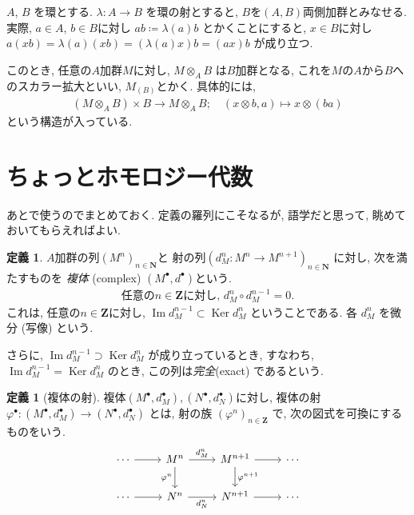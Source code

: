 \documentclass[11pt, a4paper, dvipdfmx]{jsarticle}
\theoremstyle{definition}
\newtheorem{Definition}[Axiom]{定義}
\newcommand{\nn}{\mathbf{N}}
\newcommand{\zz}{\mathbf{Z}}
\newcommand{\Ker}{\mathop{\mathrm{Ker}}\nolimits}
\newcommand{\Img}{\mathop{\mathrm{Im}}\nolimits}
\newcommand{\pphi}{\varphi} %
\numberwithin{equation}{section}
\begin{document}


$A$, $B$ を環とする. $\lambda: A\to B$ を環の射とすると, 
$B$を$(A,B)$両側加群とみなせる. 
実際, $a\in A$, $b\in B$に対し
$ab \coloneqq\lambda(a)b$
とかくことにすると, $x\in B$に対し
$a(xb) = \lambda(a)(xb) = (\lambda(a)x)b = (ax)b$
が成り立つ. 

このとき, 任意の$A$加群$M$に対し, 
$M\otimes_A B$ は$B$加群となる, 
これを$M$の$A$から$B$へのスカラー拡大といい, $M_{(B)}$とかく. 
具体的には, 
\begin{align*}
    (M\otimes_A B) \times B\to M\otimes_A B; \quad
    (x\otimes b, a) \mapsto x\otimes(ba)
\end{align*}
という構造が入っている. 

\section{ちょっとホモロジー代数}

あとで使うのでまとめておく. 
定義の羅列にこそなるが, 語学だと思って, 
眺めておいてもらえればよい. 

\begin{Definition}
    $A$加群の列$(M^n)_{n\in\nn}$と
    射の列$(d_M^n\colon M^n\to M^{n+1})_{n\in\nn}$
    に対し, 次を満たすものを
    \emph{複体} (complex) $(M^\bullet,d^\bullet)$という. 
    \begin{align*}
        \text{任意の}n\in\zz \text{に対し, }
        d_M^n\circ d_M^{n-1} = 0. 
    \end{align*}
    これは, 任意の$n\in\zz$に対し, 
    $\Img d_M^{n-1} \subset\Ker d_M^n$
    ということである. 
    各 $d_M^n$ を微分 (写像) という. 
\end{Definition}

さらに, $\Img d_M^{n-1} \supset\Ker d_M^n$
が成り立っているとき, すなわち, 
$\Img d_M^{n-1} = \Ker d_M^n$
のとき, この列は\emph{完全}(exact) であるという. 

\begin{Definition}[複体の射] 
    複体$(M^\bullet,d_M^\bullet), 
    (N^\bullet,d_N^\bullet)$に対し, 複体の射 
    $\pphi^\bullet\colon (M^\bullet,d_M^\bullet)\to (N^\bullet,d_N^\bullet)$
    とは, 射の族 $(\pphi^n)_{n\in\zz}$ で, 
    次の図式を可換にするものをいう. 
    \[\begin{tikzcd}
        \cdots \arrow[r]& M^n\arrow[d,"\pphi^n"'] \arrow[r,"d_M^{n}"]& M^{n+1} \arrow[d,"\pphi^{n+1}"]\arrow[r]& \cdots\\
        \cdots \arrow[r]& N^n \arrow[r, "d_N^{n}"']& N^{n+1} \arrow[r]& \cdots
    \end{tikzcd}\]
\end{Definition}
\end{document}
